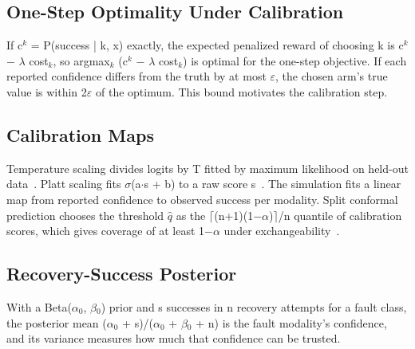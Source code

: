 \documentclass[journal]{IEEEtran}
\begin{document}
\subsection{One-Step Optimality Under Calibration}\label{app:opt}
If c\ensuremath{^k} = P(success | k, x) exactly, the expected penalized reward of choosing k is c\ensuremath{^k} \ensuremath{-} \ensuremath{\lambda} cost\ensuremath{_k}, so argmax\ensuremath{_k} (c\ensuremath{^k} \ensuremath{-} \ensuremath{\lambda} cost\ensuremath{_k}) is optimal for the one-step objective. If each reported confidence differs from the truth by at most \ensuremath{\varepsilon}, the chosen arm's true value is within 2\ensuremath{\varepsilon} of the optimum. This bound motivates the calibration step.


\subsection{Calibration Maps}\label{app:calib}
Temperature scaling divides logits by T fitted by maximum likelihood on held-out data~\cite{Guo2017}. Platt scaling fits \ensuremath{\sigma}(a\ensuremath{\cdot }s + b) to a raw score s~\cite{Zollo2025}. The simulation fits a linear map from reported confidence to observed success per modality. Split conformal prediction chooses the threshold \ensuremath{\hat{q}} as the \ensuremath{\lceil }(n+1)(1\ensuremath{-}\ensuremath{\alpha})\ensuremath{\rceil }/n quantile of calibration scores, which gives coverage of at least 1\ensuremath{-}\ensuremath{\alpha} under exchangeability~\cite{Ren2023}.


\subsection{Recovery-Success Posterior}\label{app:beta}
With a Beta(\ensuremath{\alpha}\ensuremath{_0}, \ensuremath{\beta}\ensuremath{_0}) prior and s successes in n recovery attempts for a fault class, the posterior mean (\ensuremath{\alpha}\ensuremath{_0} + s)/(\ensuremath{\alpha}\ensuremath{_0} + \ensuremath{\beta}\ensuremath{_0} + n) is the fault modality's confidence, and its variance measures how much that confidence can be trusted.
\end{document}
